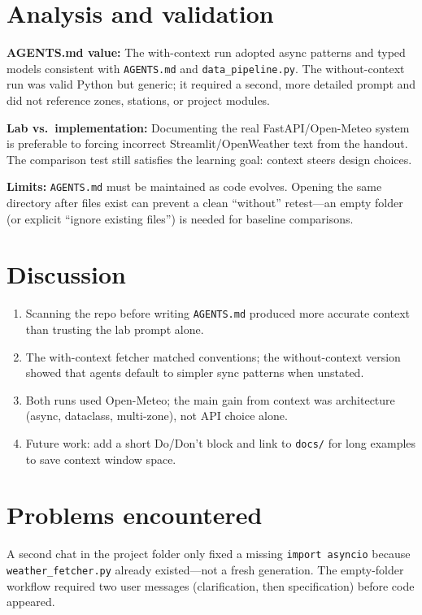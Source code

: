 \documentclass[11pt,a4paper]{article}
\begin{document}
\section{Analysis and validation}

\textbf{AGENTS.md value:} The with-context run adopted async patterns and typed models consistent with \texttt{AGENTS.md} and \texttt{data\_pipeline.py}. The without-context run was valid Python but generic; it required a second, more detailed prompt and did not reference zones, stations, or project modules.

\textbf{Lab vs.\ implementation:} Documenting the real FastAPI/Open-Meteo system is preferable to forcing incorrect Streamlit/OpenWeather text from the handout. The comparison test still satisfies the learning goal: context steers design choices.

\textbf{Limits:} \texttt{AGENTS.md} must be maintained as code evolves. Opening the same directory after files exist can prevent a clean ``without'' retest---an empty folder (or explicit ``ignore existing files'') is needed for baseline comparisons.

\section{Discussion}
\begin{enumerate}[noitemsep]
  \item Scanning the repo before writing \texttt{AGENTS.md} produced more accurate context than trusting the lab prompt alone.
  \item The with-context fetcher matched conventions; the without-context version showed that agents default to simpler sync patterns when unstated.
  \item Both runs used Open-Meteo; the main gain from context was architecture (async, dataclass, multi-zone), not API choice alone.
  \item Future work: add a short Do/Don't block and link to \texttt{docs/} for long examples to save context window space.
\end{enumerate}

\section{Problems encountered}
A second chat in the project folder only fixed a missing \texttt{import asyncio} because \texttt{weather\_fetcher.py} already existed---not a fresh generation. The empty-folder workflow required two user messages (clarification, then specification) before code appeared.
\end{document}
